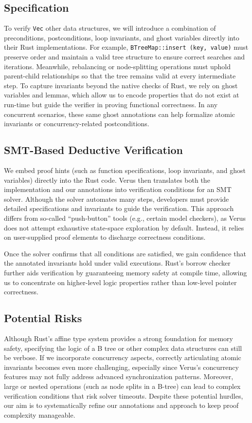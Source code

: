 \documentclass[conference]{IEEEtran}
\begin{document}
\subsection{Specification}
To verify \texttt{Vec} other data structures, we will introduce a combination of preconditions, postconditions, loop invariants, and ghost variables directly into their Rust implementations. For example, \texttt{BTreeMap::insert (key, value)} must preserve order and maintain a valid tree structure to ensure correct searches and iterations. Meanwhile, rebalancing or node-splitting operations must uphold parent-child relationships so that the tree remains valid at every intermediate step. To capture invariants beyond the native checks of Rust, we rely on ghost variables and lemmas, which allow us to encode properties that do not exist at run-time but guide the verifier in proving functional correctness. In any concurrent scenarios, these same ghost annotations can help formalize atomic invariants or concurrency-related postconditions.

\subsection{SMT-Based Deductive Verification}

We embed proof hints (such as function specifications, loop invariants, and ghost variables) directly into the Rust code. Verus then translates both the implementation and our annotations into verification conditions for an SMT solver. Although the solver automates many steps, developers must provide detailed specifications and invariants to guide the verification. This approach differs from so-called “push-button” tools (e.g., certain model checkers), as Verus does not attempt exhaustive state-space exploration by default. Instead, it relies on user-supplied proof elements to discharge correctness conditions. 

Once the solver confirms that all conditions are satisfied, we gain confidence that the annotated invariants hold under valid executions. Rust’s borrow checker further aids verification by guaranteeing memory safety at compile time, allowing us to concentrate on higher-level logic properties rather than low-level pointer correctness.

\subsection{Potential Risks}
Although Rust’s affine type system provides a strong foundation for memory safety, specifying the logic of a B tree or other complex data structures can still be verbose. If we incorporate concurrency aspects, correctly articulating atomic invariants becomes even more challenging, especially since Verus’s concurrency features may not fully address advanced synchronization patterns. Moreover, large or nested operations (such as node splits in a B-tree) can lead to complex verification conditions that risk solver timeouts. Despite these potential hurdles, our aim is to systematically refine our annotations and approach to keep proof complexity manageable.
\end{document}
